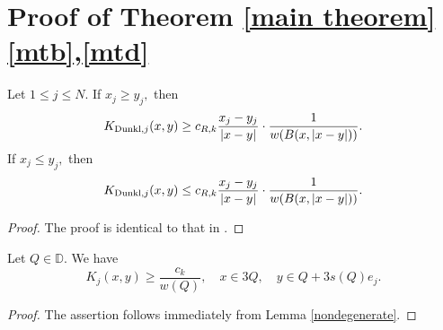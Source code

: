 \documentclass{amsart}
\begin{document}
\section{Proof of Theorem \ref{main theorem} \eqref{mtb},\eqref{mtd}}\label{lower estimate section}

\begin{lemma}\label{nondegenerate} Let $1\leq j\leq N.$ If $x_j\geq y_j,$ then
$$K_{{\rm Dunkl},j}(x,y)\geq c_{R,k}\frac{x_j-y_j}{|x-y|}\cdot\frac1{w(B(x,|x-y|))}.$$
If $x_j\leq y_j,$ then
$$K_{{\rm Dunkl},j}(x,y)\leq c_{R,k}\frac{x_j-y_j}{|x-y|}\cdot\frac1{w(B(x,|x-y|))}.$$
\end{lemma}
\begin{proof} The proof is identical to that in \cite[Theorem 1.2]{MR4733961}.
\end{proof}


\begin{lemma}\label{nondegenerate corollary} Let $Q\in\mathbb{D}.$ We have
$$K_j(x,y)\geq \frac{c_k}{w(Q)},\quad x\in 3Q,\quad y\in Q+3s(Q)e_j.$$
\end{lemma}
\begin{proof} The assertion follows immediately from Lemma \ref{nondegenerate}.
\end{proof}
\end{document}
